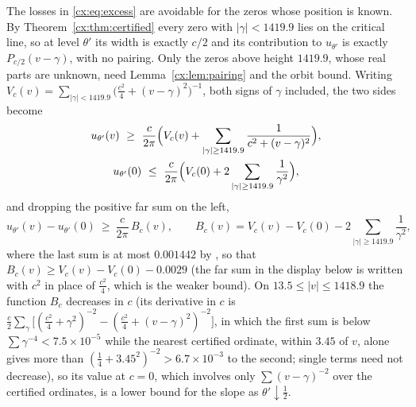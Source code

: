 The losses in \eqref{cx:eq:excess} are avoidable for the zeros whose position is known. By Theorem~\ref{cx:thm:certified} every zero with $|\gamma|<1419.9$ lies on the critical line, so at level $\theta'$ its width is exactly $c/2$ and its contribution to $u_{\theta'}$ is exactly $P_{c/2}(v-\gamma)$, with no pairing. Only the zeros above height $1419.9$, whose real parts are unknown, need Lemma~\ref{cx:lem:pairing} and the orbit bound. Writing $V_c(v)=\sum_{|\gamma|<1419.9}\bigl(\tfrac{c^2}4+(v-\gamma)^2\bigr)^{-1}$, both signs of $\gamma$ included, the two sides become
\begin{gather*}
u_{\theta'}(v)\ \ge\ \frac c{2\pi}\Bigl(V_c(v)+\sum_{|\gamma|\ge1419.9}\frac1{c^2+(v-\gamma)^2}\Bigr),\\
u_{\theta'}(0)\ \le\ \frac c{2\pi}\Bigl(V_c(0)+2\sum_{|\gamma|\ge1419.9}\frac1{\gamma^2}\Bigr),
\end{gather*}
and dropping the positive far sum on the left,
\begin{equation}\label{cx:eq:excess2}
u_{\theta'}(v)-u_{\theta'}(0)\ \ge\ \frac c{2\pi}\,B_c(v),\qquad B_c(v)=V_c(v)-V_c(0)-2\!\!\sum_{|\gamma|\ge1419.9}\!\!\frac1{\gamma^2},
\end{equation}
where the last sum is at most $0.001442$ by \cite{HSW22}, so that $B_c(v)\ge V_c(v)-V_c(0)-0.0029$ (the far sum in the display below is written with $c^2$ in place of $\tfrac{c^2}4$, which is the weaker bound). On $13.5\le|v|\le1418.9$ the function $B_c$ decreases in $c$ (its derivative in $c$ is $\tfrac c2\sum_\gamma\bigl[(\tfrac{c^2}4+\gamma^2)^{-2}-(\tfrac{c^2}4+(v-\gamma)^2)^{-2}\bigr]$, in which the first sum is below $\sum\gamma^{-4}<7.5\times10^{-5}$ while the nearest certified ordinate, within $3.45$ of $v$, alone gives more than $(\tfrac14+3.45^2)^{-2}>6.7\times10^{-3}$ to the second; single terms need not decrease), so its value at $c=0$, which involves only $\sum(v-\gamma)^{-2}$ over the certified ordinates, is a lower bound for the slope as $\theta'\downarrow\tfrac12$.

